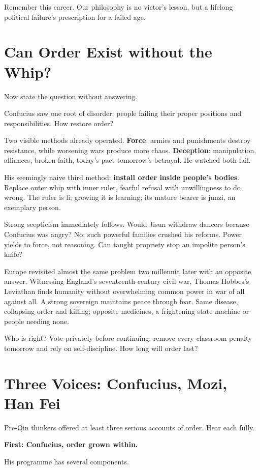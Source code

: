 Remember this career. Our philosophy is no victor's lesson, but a lifelong political failure's prescription for a failed age.

\section{Can Order Exist without the Whip?}
Now state the question without answering.

Confucius saw one root of disorder: people failing their proper positions and responsibilities. How restore order?

Two visible methods already operated. \textbf{Force}: armies and punishments destroy resistance, while worsening wars produce more chaos. \textbf{Deception}: manipulation, alliances, broken faith, today's pact tomorrow's betrayal. He watched both fail.

His seemingly naive third method: \textbf{install order inside people's bodies}. Replace outer whip with inner ruler, fearful refusal with unwillingness to do wrong. The ruler is li; growing it is learning; its mature bearer is junzi, an exemplary person.

Strong scepticism immediately follows. Would Jisun withdraw dancers because Confucius was angry? No; such powerful families crushed his reforms. Power yields to force, not reasoning. Can taught propriety stop an impolite person's knife?

Europe revisited almost the same problem two millennia later with an opposite answer. Witnessing England's seventeenth-century civil war, Thomas Hobbes's Leviathan finds humanity without overwhelming common power in war of all against all. A strong sovereign maintains peace through fear. Same disease, collapsing order and killing; opposite medicines, a frightening state machine or people needing none.

Who is right? Vote privately before continuing: remove every classroom penalty tomorrow and rely on self-discipline. How long will order last?

\section{Three Voices: Confucius, Mozi, Han Fei}
Pre-Qin thinkers offered at least three serious accounts of order. Hear each fully.

\textbf{First: Confucius, order grown within.}

His programme has several components.

